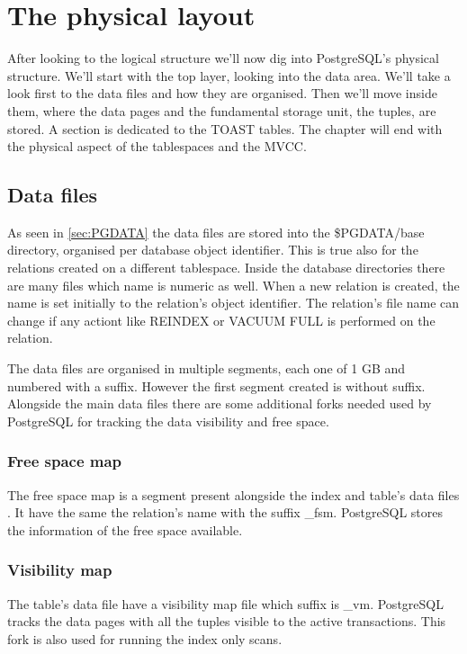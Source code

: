\chapter{The physical layout}
\label{cha:PHYLAY}
After looking to the logical structure we'll now dig into PostgreSQL's physical structure.
We'll start with the top layer, looking into the data area. We'll take a look first to the
data files and how they are organised. Then we'll move inside them, where the data pages
and the fundamental storage unit, the tuples, are stored. A section is dedicated to the
TOAST tables. The chapter will end with the physical aspect of the tablespaces and the
MVCC.

\section{Data files}
As seen in \ref{sec:PGDATA} the data files are stored into the \$PGDATA/base directory,
organised per database object identifier. This is true also for the relations created
on a different tablespace. Inside the database directories there are many files which
name is numeric as well. When a new relation is created, the name is set initially to the
relation's object identifier. The relation's file name can change if any actiont like
REINDEX or VACUUM FULL is performed on the relation.\newline

The data files are organised in multiple segments, each one of 1 GB and numbered with a
suffix. However the first segment created is without suffix. Alongside the main data
files there are some additional forks needed used by PostgreSQL for tracking the data
visibility and free space.

\subsection{Free space map}
The free space map is a segment present alongside the index and
table's data files . It have the same the relation's name with the suffix \_fsm.
PostgreSQL stores the information of the free space available.

\subsection{Visibility map}
The table's data file have a visibility map file which suffix is \_vm. PostgreSQL
tracks the data pages with all the tuples visible to the active transactions. This fork
is also used for running the index only scans.

